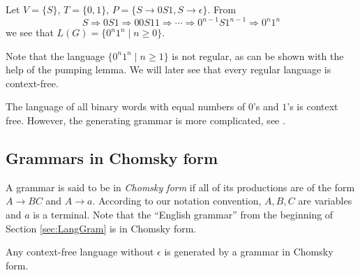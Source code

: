 \begin{page}

\begin{exl}
\label{exl:0n1n}
Let $V = \{S\}$, $T = \{0, 1\}$, $P = \{S \to 0S1, S \to \epsilon\}$.
From
\[
S \Rightarrow 0S1 \Rightarrow 00S11 \Rightarrow \cdots \Rightarrow 0^{n-1}S1^{n-1} \Rightarrow 0^n1^n
\]
we see that $L(G) = \{0^n1^n \mid n \ge 0\}$.
\end{exl}

\end{page}

\begin{page}


Note that the language $\{0^n1^n \mid n \ge 1\}$ is not regular, as can be shown with the help of the pumping lemma.
We will later see that every regular language is context-free.


\end{page}

\begin{page}

\begin{exl}
The language of all binary words with equal numbers of $0$'s and $1$'s is context free.
However, the generating grammar is more complicated, see \cite[Example 4.3]{HU79}.
\end{exl}

\end{page}

\begin{page}

\subsection{Grammars in Chomsky form}
A grammar is said to be in \emph{Chomsky form} if all of its productions are of the form $A \to BC$ and $A \to a$.
According to our notation convention, $A, B, C$ are variables and $a$ is a terminal.
Note that the ``English grammar'' from the beginning of Section \ref{sec:LangGram} is in Chomsky form.


\end{page}

\begin{page}

\begin{thm}
\label{thm:ChomskyForm}
Any context-free language without $\epsilon$ is generated by a grammar in Chomsky form.
\end{thm}

\end{page}

